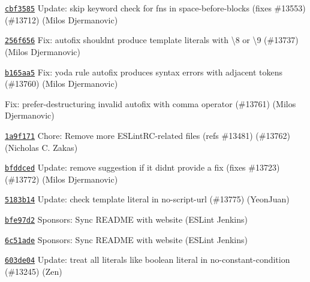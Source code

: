 \begin{DoxyItemize}
\item \href{https://github.com/eslint/eslint/commit/cbf3585f1d6c60414c07380367a8b4505ee3538d}{\texttt{ {\ttfamily cbf3585}}} Update\+: skip keyword check for fns in space-\/before-\/blocks (fixes \#13553) (\#13712) (Milos Djermanovic)
\item \href{https://github.com/eslint/eslint/commit/256f656455b47bcf9ed3fc30fbf72532678f97da}{\texttt{ {\ttfamily 256f656}}} Fix\+: autofix shouldn\textquotesingle{}t produce template literals with {\ttfamily \textbackslash{}8} or {\ttfamily \textbackslash{}9} (\#13737) (Milos Djermanovic)
\item \href{https://github.com/eslint/eslint/commit/b165aa5f4d4d19328f13ab80e5f058cbce94c3a6}{\texttt{ {\ttfamily b165aa5}}} Fix\+: yoda rule autofix produces syntax errors with adjacent tokens (\#13760) (Milos Djermanovic)
\item \href{https://github.com/eslint/eslint/commit/3175316db26aebef4b19e269aca90c8ce3955363}{\texttt{ {}}} Fix\+: prefer-\/destructuring invalid autofix with comma operator (\#13761) (Milos Djermanovic)
\item \href{https://github.com/eslint/eslint/commit/1a9f17151a4e93eb17c8a2bf4f0a5320cce616de}{\texttt{ {\ttfamily 1a9f171}}} Chore\+: Remove more ESLint\+RC-\/related files (refs \#13481) (\#13762) (Nicholas C. Zakas)
\item \href{https://github.com/eslint/eslint/commit/bfddcedace5587d662c840c2edf33062b54a178e}{\texttt{ {\ttfamily bfddced}}} Update\+: remove suggestion if it didn\textquotesingle{}t provide a fix (fixes \#13723) (\#13772) (Milos Djermanovic)
\item \href{https://github.com/eslint/eslint/commit/5183b14a2420b42b4089fb134a61ae57142f31fd}{\texttt{ {\ttfamily 5183b14}}} Update\+: check template literal in no-\/script-\/url (\#13775) (Yeon\+Juan)
\item \href{https://github.com/eslint/eslint/commit/bfe97d2332e711ca76b1fd2e7f8548b0cc84cb1c}{\texttt{ {\ttfamily bfe97d2}}} Sponsors\+: Sync README with website (ESLint Jenkins)
\item \href{https://github.com/eslint/eslint/commit/6c51adeb86f1de292cd02d2ee19f7b56182e358b}{\texttt{ {\ttfamily 6c51ade}}} Sponsors\+: Sync README with website (ESLint Jenkins)
\item \href{https://github.com/eslint/eslint/commit/603de04cab5e700df12999af2918decd4da9d11b}{\texttt{ {\ttfamily 603de04}}} Update\+: treat all literals like boolean literal in no-\/constant-\/condition (\#13245) (Zen)

\end{DoxyItemize}
